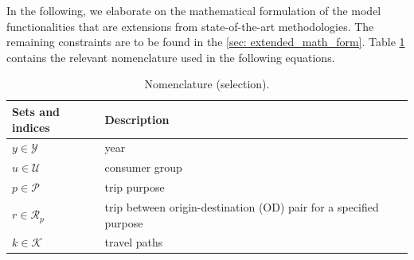 \documentclass[preprint,review,11pt, authoryear]{elsarticle}
\begin{document}
 In the following, we elaborate on the mathematical formulation of the model functionalities that are extensions from state-of-the-art methodologies. The remaining constraints are to be found in the \ref{sec: extended_math_form}. Table \ref{tab:nomenclature_main_sel} contains the relevant nomenclature used in the following equations.
 \begin{scriptsize}
\begin{longtable}{llll}
\caption{Nomenclature (selection).}
\label{tab:nomenclature_main_sel}\\
\hline
Sets and indices                         & Description                                                          &         &               \\ \hline
\endfirsthead
%
\endhead
%
\hline
\endfoot
%
\endlastfoot
%
$y \in \mathcal{Y}$                      & year                                                                 &         &               \\

$u \in \mathcal{U}$                      & consumer group                                                           &         &               \\
$p \in \mathcal{P}$                      & trip purpose                                                         &         &               \\
$r \in \mathcal{R}_p$                      & trip between origin-destination (OD) pair for a specified purpose                                        &         &               \\
$k \in \mathcal{K}$                      & travel paths                                                         &         &               \\


\end{longtable}
\end{scriptsize}
\end{document}
